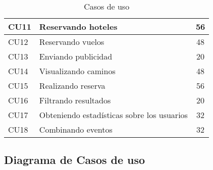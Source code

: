 \begin{table}[]
\begin{tabular}{|l|l|c|}
CU11                                                          & Reservando hoteles                                                & 56                    \\ \hline
CU12                                                          & Reservando vuelos                                                 & 48                    \\ \hline
CU13                                                          & Enviando publicidad                                               & 20                    \\ \hline
CU14                                                          & Visualizando caminos                                              & 48                    \\ \hline
CU15                                                          & Realizando reserva                                                & 56                    \\ \hline
CU16                                                          & Filtrando resultados                                              & 20                    \\ \hline
CU17                                                          & Obteniendo estadísticas sobre los usuarios                        & 32                    \\ \hline
CU18                                                          & Combinando eventos                                                & 32                    \\ \hline
\end{tabular}
\caption{Casos de uso}
\label{tab:cu}
\end{table}

\subsection{Diagrama de Casos de uso}

